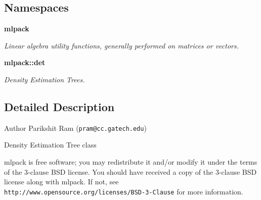 \subsection*{Namespaces}
\begin{DoxyCompactItemize}
\item 
 \textbf{ mlpack}
\begin{DoxyCompactList}\small\item\em Linear algebra utility functions, generally performed on matrices or vectors. \end{DoxyCompactList}\item 
 \textbf{ mlpack\+::det}
\begin{DoxyCompactList}\small\item\em Density Estimation Trees. \end{DoxyCompactList}\end{DoxyCompactItemize}


\subsection{Detailed Description}
\begin{DoxyAuthor}{Author}
Parikshit Ram ({\tt pram@cc.\+gatech.\+edu})
\end{DoxyAuthor}
Density Estimation Tree class

mlpack is free software; you may redistribute it and/or modify it under the terms of the 3-\/clause B\+SD license. You should have received a copy of the 3-\/clause B\+SD license along with mlpack. If not, see {\tt http\+://www.\+opensource.\+org/licenses/\+B\+S\+D-\/3-\/\+Clause} for more information. 